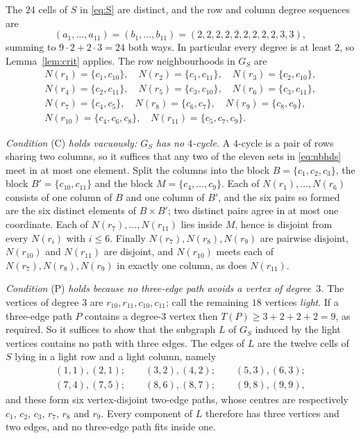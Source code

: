 \documentclass[11pt]{amsart}
\theoremstyle{remark}
\begin{document}
The $24$ cells of $S$ in \eqref{eq:S} are distinct, and the row and column
degree sequences are
\[
  (a_1,\dots,a_{11})=(b_1,\dots,b_{11})=(2,2,2,2,2,2,2,2,2,3,3),
\]
summing to $9\cdot2+2\cdot3=24$ both ways. In particular every degree is at
least $2$, so Lemma~\ref{lem:crit} applies. The row neighbourhoods in $G_S$ are
\begin{equation}\label{eq:nbhds}
\begin{gathered}
 N(r_1)=\{c_1,c_{10}\},\quad N(r_2)=\{c_1,c_{11}\},\quad
 N(r_3)=\{c_2,c_{10}\},\\
 N(r_4)=\{c_2,c_{11}\},\quad N(r_5)=\{c_3,c_{10}\},\quad
 N(r_6)=\{c_3,c_{11}\},\\
 N(r_7)=\{c_4,c_5\},\quad N(r_8)=\{c_6,c_7\},\quad
 N(r_9)=\{c_8,c_9\},\\
 N(r_{10})=\{c_4,c_6,c_8\},\quad N(r_{11})=\{c_5,c_7,c_9\}.
\end{gathered}
\end{equation}

\emph{Condition} (C) \emph{holds vacuously: $G_S$ has no $4$-cycle.} A
$4$-cycle is a pair of rows sharing two columns, so it suffices that any two of
the eleven sets in \eqref{eq:nbhds} meet in at most one element. Split the
columns into the block $B=\{c_1,c_2,c_3\}$, the block
$B'=\{c_{10},c_{11}\}$ and the block $M=\{c_4,\dots,c_9\}$. Each of
$N(r_1),\dots,N(r_6)$ consists of one column of $B$ and one column of $B'$, and
the six pairs so formed are the six distinct elements of $B\times B'$; two
distinct pairs agree in at most one coordinate. Each of
$N(r_7),\dots,N(r_{11})$ lies inside $M$, hence is disjoint from every
$N(r_i)$ with $i\le6$. Finally $N(r_7),N(r_8),N(r_9)$ are pairwise
disjoint, $N(r_{10})$ and $N(r_{11})$ are disjoint, and $N(r_{10})$ meets each
of $N(r_7),N(r_8),N(r_9)$ in exactly one column, as does $N(r_{11})$.

\emph{Condition} (P) \emph{holds because no three-edge path avoids a vertex of
degree~$3$.} The vertices of degree $3$ are $r_{10},r_{11},c_{10},c_{11}$; call
the remaining $18$ vertices \emph{light}. If a three-edge path $P$ contains a
degree-$3$ vertex then $T(P)\ge3+2+2+2=9$, as required. So it suffices to show
that the subgraph $L$ of $G_S$ induced by the light vertices contains no path
with three edges. The edges of $L$ are the twelve cells of $S$ lying in a light
row and a light column, namely
\[
\begin{gathered}
  (1,1),(2,1);\qquad (3,2),(4,2);\qquad (5,3),(6,3);\\
  (7,4),(7,5);\qquad (8,6),(8,7);\qquad (9,8),(9,9),
\end{gathered}
\]
and these form six vertex-disjoint two-edge paths, whose centres are
respectively $c_1$, $c_2$, $c_3$, $r_7$, $r_8$ and $r_9$. Every component of
$L$ therefore has
three vertices and two edges, and no three-edge path fits inside one.
\end{document}
